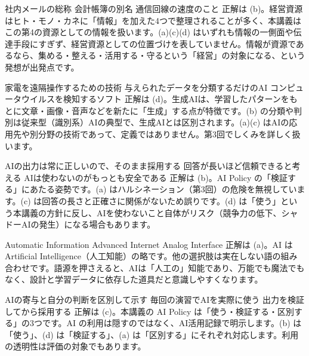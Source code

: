 
%
  {社内メールの総称}%
  {}%
  {会計帳簿の別名}%
  {通信回線の速度のこと}%
  {正解は (b)。経営資源はヒト・モノ・カネに「情報」を加えた4つで整理されることが多く、本講義はこの第4の資源としての情報を扱います。(a)(c)(d) はいずれも情報の一側面や伝達手段にすぎず、経営資源としての位置づけを表していません。情報が資源であるなら、集める・整える・活用する・守るという「経営」の対象になる、という発想が出発点です。}

%
  {家電を遠隔操作するための技術}%
  {与えられたデータを分類するだけのAI}%
  {コンピュータウイルスを検知するソフト}%
  {}%
  {正解は (d)。生成AIは、学習したパターンをもとに文章・画像・音声などを新たに「生成」する点が特徴です。(b) の分類や判別は従来型（識別系）AIの典型で、生成AIとは区別されます。(a)(c) はAIの応用先や別分野の技術であって、定義ではありません。第3回でしくみを詳しく扱います。}

%
  {AIの出力は常に正しいので、そのまま採用する}%
  {}%
  {回答が長いほど信頼できると考える}%
  {AIは使わないのがもっとも安全である}%
  {正解は (b)。AI Policy の「検証する」にあたる姿勢です。(a) はハルシネーション（第3回）の危険を無視しています。(c) は回答の長さと正確さに関係がないため誤りです。(d) は「使う」という本講義の方針に反し、AIを使わないこと自体がリスク（競争力の低下、シャドーAIの発生）になる場合もあります。}

%
  {}%
  {Automatic Information}%
  {Advanced Internet}%
  {Analog Interface}%
  {正解は (a)。AI は Artificial Intelligence（人工知能）の略です。他の選択肢は実在しない語の組み合わせです。語源を押さえると、AIは「人工の」知能であり、万能でも魔法でもなく、設計と学習データに依存した道具だと意識しやすくなります。}

%
  {AIの寄与と自分の判断を区別して示す}%
  {毎回の演習でAIを実際に使う}%
  {}%
  {出力を検証してから採用する}%
  {正解は (c)。本講義の AI Policy は「使う・検証する・区別する」の3つです。AI の利用は隠すのではなく、AI活用記録で明示します。(b) は「使う」、(d) は「検証する」、(a) は「区別する」にそれぞれ対応します。利用の透明性は評価の対象でもあります。}
